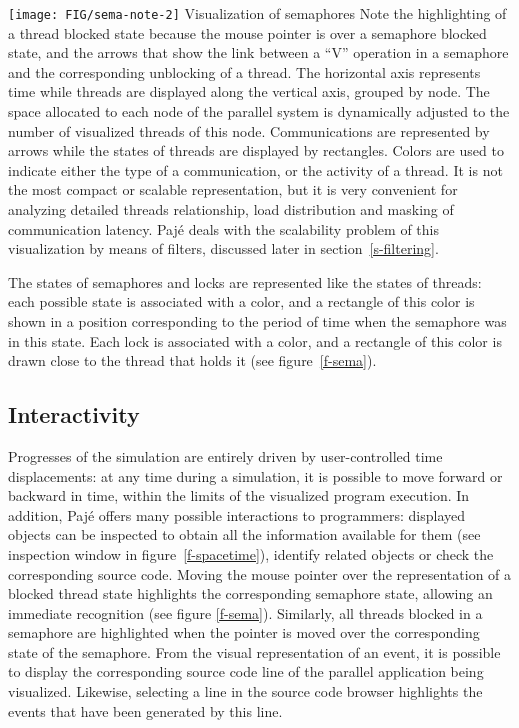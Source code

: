  {\texttt{[image: FIG/sema-note-2]}} {Visualization of
  semaphores} {Note the highlighting of a thread blocked state because
  the mouse pointer is over a semaphore blocked state, and the arrows
  that show the link between a ``V'' operation in a semaphore and the
  corresponding unblocking of a thread.}
%
The horizontal axis represents time while threads are displayed along
the vertical axis, grouped by node. The space allocated to each node
of the parallel system is dynamically adjusted to the number of
visualized threads of this node.  Communications are represented by
arrows while the states of threads are displayed by rectangles. Colors
are used to indicate either the type of a communication, or the
activity of a thread.  It is not the most compact or scalable
representation, but it is very convenient for analyzing detailed
threads relationship, load distribution and masking of communication
latency.  Pajé deals with the scalability problem of this
visualization by means of filters, discussed later in
section~\ref{s-filtering}.

The states of semaphores and locks are represented like the states of
threads: each possible state is associated with a color, and a
rectangle of this color is shown in a position corresponding to the
period of time when the semaphore was in this state. Each lock is
associated with a color, and a rectangle of this color is drawn close
to the thread that holds it (see figure~\ref{f-sema}).

\subsection{Interactivity}

Progresses of the simulation are entirely driven by user-controlled
time displacements: at any time during a simulation, it is possible to
move forward or backward in time, within the limits of the visualized
program execution.  In addition, Pajé offers many possible
interactions to programmers: displayed objects can be inspected to
obtain all the information available for them (see inspection window
in figure~\ref{f-spacetime}), identify related objects or check the
corresponding source code.  Moving the mouse pointer over the
representation of a blocked thread state highlights the corresponding
semaphore state, allowing an immediate recognition (see figure
\ref{f-sema}).  Similarly, all threads blocked in a semaphore are
highlighted when the pointer is moved over the corresponding state of
the semaphore.  From the visual representation of an event, it is
possible to display the corresponding source code line of the parallel
application being visualized.  Likewise, selecting a line in the
source code browser highlights the events that have been generated by
this line.

